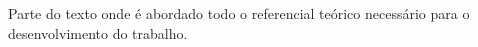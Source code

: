 Parte do texto onde é abordado todo o referencial teórico necessário para o desenvolvimento do trabalho.